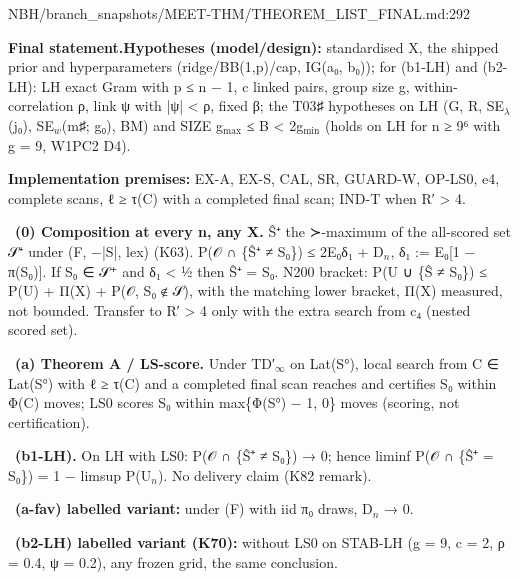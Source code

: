 \begin{stmt}{NBH/branch_snapshots/MEET-THM/THEOREM_LIST_FINAL.md:292}
\par\smallskip\noindent\textbf{Final statement.}\enspace \textbf{Hypotheses (model/design):} standardised X, the shipped prior and hyperparameters (ridge/BB(1,p)/cap, IG(a₀, b₀)); for (b1-LH) and (b2-LH): LH exact Gram with p ≤ n − 1, c linked pairs, group size g, within-correlation ρ, link ψ with |ψ| \textless{} ρ, fixed β; the T03♯ hypotheses on LH (G, R, SE$_{λ}$(j₀), SE$_{w}$(m♯; g₀), BM) and SIZE g$_{\mathrm{max}}$ ≤ B \textless{} 2g$_{\mathrm{min}}$ (holds on LH for n ≥ 9⁶ with g = 9, W1PC2 D4). \par \textbf{Implementation premises:} EX-A, EX-S, CAL, SR, GUARD-W, OP-LS0, e4, complete scans, ℓ ≥ τ(C) with a completed final scan; IND-T when R′ \textgreater{} 4. \par {}\ \textbf{(0) Composition at every n, any X.} Ŝ⁺ the ≻-maximum of the all-scored set 𝒮⁺ under (F, −|S|, lex) (K63). P(𝒪 ∩ \{Ŝ⁺ ≠ S₀\}) ≤ 2E₀δ₁ + D$_{n}$, δ₁ := E₀[1 − π(S₀)]. If S₀ ∈ 𝒮⁺ and δ₁ \textless{} ½ then Ŝ⁺ = S₀. N200 bracket: P(U ∪ \{Ŝ ≠ S₀\}) ≤ P(U) + Π(X) + P(𝒪, S₀ ∉ 𝒮), with the matching lower bracket, Π(X) measured, not bounded. Transfer to R′ \textgreater{} 4 only with the extra search from c₄ (nested scored set). \par {}\ \textbf{(a) Theorem A / LS-score.} Under TD′$_{∞}$ on Lat(S°), local search from C ∈ Lat(S°) with ℓ ≥ τ(C) and a completed final scan reaches and certifies S₀ within Φ(C) moves; LS0 scores S₀ within max\{Φ(S°) − 1, 0\} moves (scoring, not certification). \par {}\ \textbf{(b1-LH).} On LH with LS0: P(𝒪 ∩ \{Ŝ⁺ ≠ S₀\}) → 0; hence liminf P(𝒪 ∩ \{Ŝ⁺ = S₀\}) = 1 − limsup P(U$_{n}$). No delivery claim (K82 remark). \par {}\ \textbf{(a-fav) labelled variant:} under (F) with iid π₀ draws, D$_{n}$ → 0. \par {}\ \textbf{(b2-LH) labelled variant (K70):} without LS0 on STAB-LH (g = 9, c = 2, ρ = 0.4, ψ = 0.2), any frozen grid, the same conclusion.
\end{stmt}

